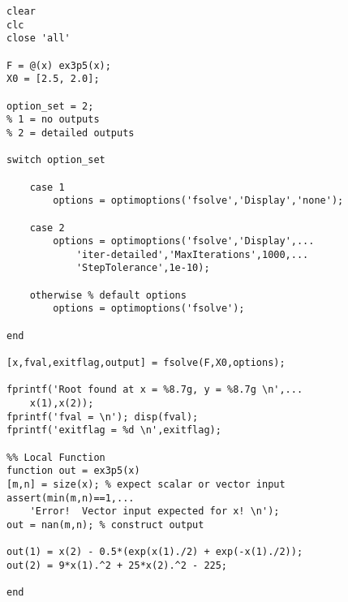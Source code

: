 \begin{lstlisting}[name=lec6n-ex2, style=myMatlab]
clear
clc
close 'all'

F = @(x) ex3p5(x);
X0 = [2.5, 2.0];

option_set = 2;
% 1 = no outputs
% 2 = detailed outputs

switch option_set
    
    case 1
        options = optimoptions('fsolve','Display','none');
        
    case 2
        options = optimoptions('fsolve','Display',...
            'iter-detailed','MaxIterations',1000,...
            'StepTolerance',1e-10);
        
    otherwise % default options
        options = optimoptions('fsolve');
        
end

[x,fval,exitflag,output] = fsolve(F,X0,options);

fprintf('Root found at x = %8.7g, y = %8.7g \n',...
    x(1),x(2));
fprintf('fval = \n'); disp(fval);
fprintf('exitflag = %d \n',exitflag);

%% Local Function
function out = ex3p5(x)
[m,n] = size(x); % expect scalar or vector input
assert(min(m,n)==1,...
    'Error!  Vector input expected for x! \n');
out = nan(m,n); % construct output

out(1) = x(2) - 0.5*(exp(x(1)./2) + exp(-x(1)./2));
out(2) = 9*x(1).^2 + 25*x(2).^2 - 225;

end
\end{lstlisting}
  


